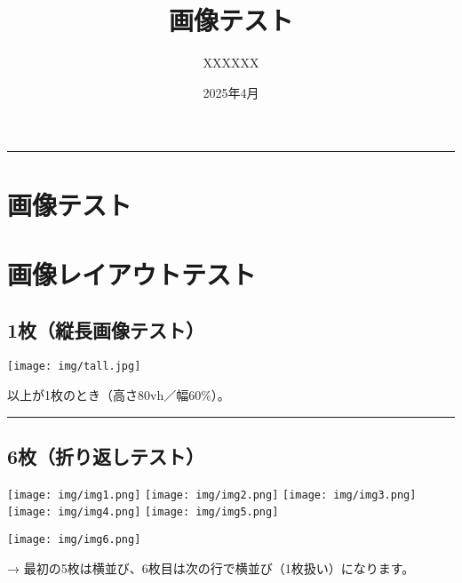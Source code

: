 \documentclass[
]{article}
\title{画像テスト}
\author{XXXXXX}
\date{2025年4月}
\makeatletter
\renewcommand{\maketitle}{
  \begin{center}
    {\LARGE\bfseries \@title \par}
    \vspace{1em}
  \end{center}

  \begin{flushright}  %
    {\small \@author \par}              %
    \vspace{0.5em}
    {\small \@date \par}                %
    \vspace{0.5em}\rule{\linewidth}{0.4pt} %
  \end{flushright}  

  }
\makeatother
\begin{document}
\maketitle

\section{画像テスト}\label{ux753bux50cfux30c6ux30b9ux30c8}

\section{画像レイアウトテスト}\label{ux753bux50cfux30ecux30a4ux30a2ux30a6ux30c8ux30c6ux30b9ux30c8}

\subsection{1枚（縦長画像テスト）}\label{ux679aux7e26ux9577ux753bux50cfux30c6ux30b9ux30c8}

\begin{center}
\texttt{[image: img/tall.jpg]}
\end{center}

以上が1枚のとき（高さ80vh／幅60\%）。

\begin{center}\rule{0.5\linewidth}{0.5pt}\end{center}

\subsection{6枚（折り返しテスト）}\label{ux679aux6298ux308aux8fd4ux3057ux30c6ux30b9ux30c8}

\begin{center}
\texttt{[image: img/img1.png]}
\texttt{[image: img/img2.png]}
\texttt{[image: img/img3.png]}
\texttt{[image: img/img4.png]}
\texttt{[image: img/img5.png]}
\end{center}

\begin{center}
\texttt{[image: img/img6.png]}
\end{center}

→ 最初の5枚は横並び、6枚目は次の行で横並び（1枚扱い）になります。
\end{document}
